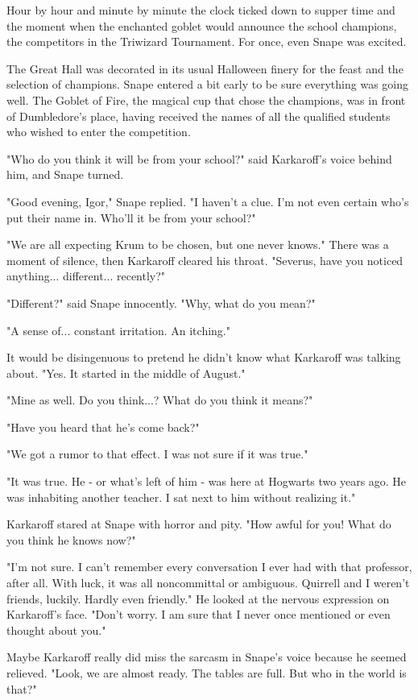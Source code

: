 Hour by hour and minute by minute the clock ticked down to supper time and the moment when the enchanted goblet would announce the school champions, the competitors in the Triwizard Tournament. For once, even Snape was excited.

The Great Hall was decorated in its usual Halloween finery for the feast and the selection of champions. Snape entered a bit early to be sure everything was going well. The Goblet of Fire, the magical cup that chose the champions, was in front of Dumbledore's place, having received the names of all the qualified students who wished to enter the competition.

"Who do you think it will be from your school?" said Karkaroff's voice behind him, and Snape turned.

"Good evening, Igor," Snape replied. "I haven't a clue. I'm not even certain who's put their name in. Who'll it be from your school?"

"We are all expecting Krum to be chosen, but one never knows." There was a moment of silence, then Karkaroff cleared his throat. "Severus, have you noticed anything... different... recently?"

"Different?" said Snape innocently. "Why, what do you mean?"

"A sense of... constant irritation. An itching."

It would be disingenuous to pretend he didn't know what Karkaroff was talking about. "Yes. It started in the middle of August."

"Mine as well. Do you think...? What do you think it means?"

"Have you heard that he's come back?"

"We got a rumor to that effect. I was not sure if it was true."

"It was true. He - or what's left of him - was here at Hogwarts two years ago. He was inhabiting another teacher. I sat next to him without realizing it."

Karkaroff stared at Snape with horror and pity. "How awful for you! What do you think he knows now?"

"I'm not sure. I can't remember every conversation I ever had with that professor, after all. With luck, it was all noncommittal or ambiguous. Quirrell and I weren't friends, luckily. Hardly even friendly." He looked at the nervous expression on Karkaroff's face. "Don't worry. I am sure that I never once mentioned or even thought about you."

Maybe Karkaroff really did miss the sarcasm in Snape's voice because he seemed relieved. "Look, we are almost ready. The tables are full. But who in the world is that?"

